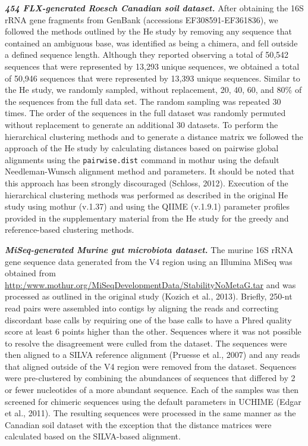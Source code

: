 \documentclass[11pt,]{article}
\begin{document}
\textbf{\emph{454 FLX-generated Roesch Canadian soil dataset.}} After
obtaining the 16S rRNA gene fragments from GenBank (accessions
EF308591-EF361836), we followed the methods outlined by the He study by
removing any sequence that contained an ambiguous base, was identified
as being a chimera, and fell outside a defined sequence length. Although
they reported observing a total of 50,542 sequences that were
represented by 13,293 unique sequences, we obtained a total of 50,946
sequences that were represented by 13,393 unique sequences. Similar to
the He study, we randomly sampled, without replacement, 20, 40, 60, and
80\% of the sequences from the full data set. The random sampling was
repeated 30 times. The order of the sequences in the full dataset was
randomly permuted without replacement to generate an additional 30
datasets. To perform the hierarchical clustering methods and to generate
a distance matrix we followed the approach of the He study by
calculating distances based on pairwise global alignments using the
\texttt{pairwise.dist} command in mothur using the default
Needleman-Wunsch alignment method and parameters. It should be noted
that this approach has been strongly discouraged (Schloss, 2012).
Execution of the hierarchical clustering methods was performed as
described in the original He study using mothur (v.1.37) and using the
QIIME (v.1.9.1) parameter profiles provided in the supplementary
material from the He study for the greedy and reference-based clustering
methods.

\textbf{\emph{MiSeq-generated Murine gut microbiota dataset.}} The
murine 16S rRNA gene sequence data generated from the V4 region using an
Illumina MiSeq was obtained from
\url{http:/www.mothur.org/MiSeqDevelopmentData/StabilityNoMetaG.tar} and
was processed as outlined in the original study (Kozich et al., 2013).
Briefly, 250-nt read pairs were assembled into contigs by aligning the
reads and correcting discordant base calls by requiring one of the base
calls to have a Phred quality score at least 6 points higher than the
other. Sequences where it was not possible to resolve the disagreement
were culled from the dataset. The sequences were then aligned to a SILVA
reference alignment (Pruesse et al., 2007) and any reads that aligned
outside of the V4 region were removed from the dataset. Sequences were
pre-clustered by combining the abundances of sequences that differed by
2 or fewer nucleotides of a more abundant sequence. Each of the samples
was then screened for chimeric sequences using the default parameters in
UCHIME (Edgar et al., 2011). The resulting sequences were processed in
the same manner as the Canadian soil dataset with the exception that the
distance matrices were calculated based on the SILVA-based alignment.
\end{document}
